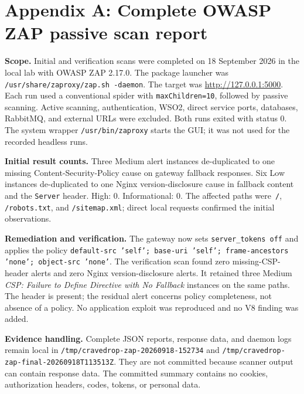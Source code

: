 \documentclass[11pt]{article}
\begin{document}
\section*{Appendix A: Complete OWASP ZAP passive scan report}
\textbf{Scope.} Initial and verification scans were completed on 18 September 2026 in the local lab with OWASP ZAP 2.17.0. The package launcher was \texttt{/usr/share/zaproxy/zap.sh -daemon}. The target was \url{http://127.0.0.1:5000}. Each run used a conventional spider with \texttt{maxChildren=10}, followed by passive scanning. Active scanning, authentication, WSO2, direct service ports, databases, RabbitMQ, and external URLs were excluded. Both runs exited with status 0. The system wrapper \texttt{/usr/bin/zaproxy} starts the GUI; it was not used for the recorded headless runs.

\textbf{Initial result counts.} Three Medium alert instances de-duplicated to one missing Content-Security-Policy cause on gateway fallback responses. Six Low instances de-duplicated to one Nginx version-disclosure cause in fallback content and the \texttt{Server} header. High: 0. Informational: 0. The affected paths were \,\texttt{/}, \texttt{/robots.txt}, and \texttt{/sitemap.xml}; direct local requests confirmed the initial observations.

\textbf{Remediation and verification.} The gateway now sets \texttt{server\_tokens off} and applies the policy \texttt{default-src 'self'; base-uri 'self'; frame-ancestors 'none'; object-src 'none'}. The verification scan found zero missing-CSP-header alerts and zero Nginx version-disclosure alerts. It retained three Medium \textit{CSP: Failure to Define Directive with No Fallback} instances on the same paths. The header is present; the residual alert concerns policy completeness, not absence of a policy. No application exploit was reproduced and no V8 finding was added.

\textbf{Evidence handling.} Complete JSON reports, response data, and daemon logs remain local in \texttt{/tmp/cravedrop-zap-20260918-152734} and \texttt{/tmp/cravedrop-zap-final-20260918T113513Z}. They are not committed because scanner output can contain response data. The committed summary contains no cookies, authorization headers, codes, tokens, or personal data.

\clearpage
\end{document}
